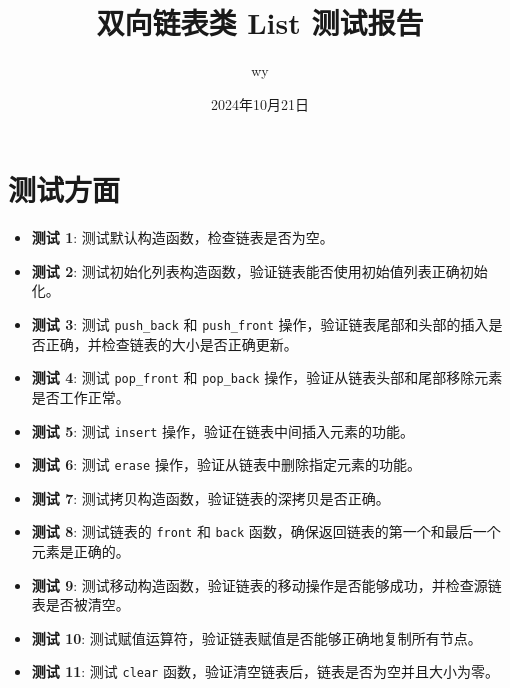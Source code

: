 \documentclass{article}
\title{双向链表类 List 测试报告}
\author{wy}
\date{2024年10月21日}
\begin{document}
\maketitle

\section{测试方面}
\begin{itemize}
    \item \textbf{测试 1}: 测试默认构造函数，检查链表是否为空。
    \item \textbf{测试 2}: 测试初始化列表构造函数，验证链表能否使用初始值列表正确初始化。
    \item \textbf{测试 3}: 测试 \texttt{push\_back} 和 \texttt{push\_front} 操作，验证链表尾部和头部的插入是否正确，并检查链表的大小是否正确更新。
    \item \textbf{测试 4}: 测试 \texttt{pop\_front} 和 \texttt{pop\_back} 操作，验证从链表头部和尾部移除元素是否工作正常。
    \item \textbf{测试 5}: 测试 \texttt{insert} 操作，验证在链表中间插入元素的功能。
    \item \textbf{测试 6}: 测试 \texttt{erase} 操作，验证从链表中删除指定元素的功能。
    \item \textbf{测试 7}: 测试拷贝构造函数，验证链表的深拷贝是否正确。
    \item \textbf{测试 8}: 测试链表的 \texttt{front} 和 \texttt{back} 函数，确保返回链表的第一个和最后一个元素是正确的。
    \item \textbf{测试 9}: 测试移动构造函数，验证链表的移动操作是否能够成功，并检查源链表是否被清空。
    \item \textbf{测试 10}: 测试赋值运算符，验证链表赋值是否能够正确地复制所有节点。
    \item \textbf{测试 11}: 测试 \texttt{clear} 函数，验证清空链表后，链表是否为空并且大小为零。
\end{itemize}
\end{document}

